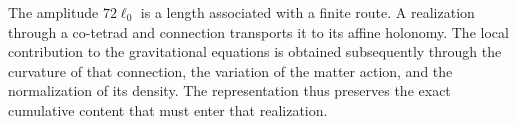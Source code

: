 The amplitude \(72\ell_0\) is a length associated with a finite route.
A realization through a co-tetrad and connection transports it to its
affine holonomy. The local contribution to the gravitational equations
is obtained subsequently through the curvature of that connection, the
variation of the matter action, and the normalization of its density.
The representation thus preserves the exact cumulative content that
must enter that realization.
